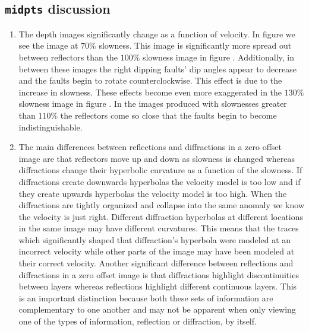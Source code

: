 \subsection{\texttt{midpts} discussion}
\begin{enumerate}
  
  \item The depth images significantly change as a function of velocity. In figure  we see the image at $70\%$ slowness. This image is significantly more spread out between reflectors than the $100\%$ slowness image in figure . Additionally, in between these images the right dipping faults' dip angles appear to decrease and the faults begin to rotate counterclockwise. This effect is due to the increase in slowness. These effects become even more exaggerated in the $130\%$ slowness image in figure . In the images produced with slownesses greater than $110\%$ the reflectors come so close that the faults begin to become indistinguishable.  

  \item The main differences between reflections and diffractions in a zero offset image are that reflectors move up and down as slowness is changed whereas diffractions change their hyperbolic curvature as a function of the slowness. If diffractions create downwards hyperbolas the velocity model is too low and if they create upwards hyperbolas the velocity model is too high. When the diffractions are tightly organized and collapse into the same anomaly we know the velocity is just right. Different diffraction hyperbolas at different locations in the same image may have different curvatures. This means that the traces which significantly shaped that diffraction's hyperbola were modeled at an incorrect velocity while other parts of the image may have been modeled at their correct velocity. Another significant difference between reflections and diffractions in a zero offset image is that diffractions highlight discontinuities between layers whereas reflections highlight different continuous layers. This is an important distinction because both these sets of information are complementary to one another and may not be apparent when only viewing one of the types of information, reflection or diffraction, by itself.


\end{enumerate}
